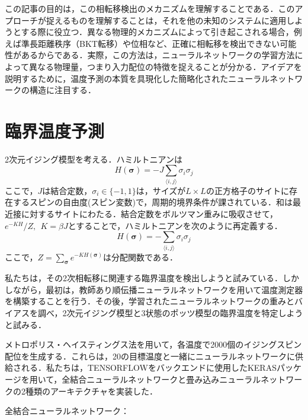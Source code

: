 \documentclass[a4paper,11pt]{jsarticle}
\begin{document}
この記事の目的は，この相転移検出のメカニズムを理解することである．このアプローチが捉えるものを理解することは，それを他の未知のシステムに適用しようとする際に役立つ．異なる物理的メカニズムによって引き起こされる場合，例えば準長距離秩序（BKT転移）や位相など、正確に相転移を検出できない可能性があるからである．実際，この方法は，ニューラルネットワークの学習方法によって異なる物理量，つまり入力配位の特徴を捉えることが分かる．アイデアを説明するために，温度予測の本質を具現化した簡略化されたニューラルネットワークの構造に注目する．

\section{臨界温度予測}
2次元イジング模型を考える．ハミルトニアンは
\begin{equation*}
  H(\bm{\sigma}) = - J \sum_{\langle i,j \rangle} \sigma_i \sigma_j
\end{equation*}
ここで，$J$は結合定数，$\sigma_i \in \{ -1, 1 \}$は，サイズが$L \times L$の正方格子のサイトに存在するスピンの自由度(スピン変数)で，周期的境界条件が課されている．和は最近接に対するサイトにわたる．結合定数をボルツマン重みに吸収させて，$e^{-KH}/Z, \ \ K = \beta J$とすることで，ハミルトニアンを次のように再定義する．
\begin{equation}
  H(\bm{\sigma}) = - \sum_{\langle i,j \rangle} \sigma_i \sigma_j
\end{equation}
ここで，$Z = \sum_{\bm{\sigma}}e^{-KH(\bm{\sigma})}$は分配関数である．\par
私たちは，その2次相転移に関連する臨界温度を検出しようと試みている．しかしながら，最初は，教師あり順伝播ニューラルネットワークを用いて温度測定器を構築することを行う．その後，学習されたニューラルネットワークの重みとバイアスを調べ，2次元イジング模型と3状態のポッツ模型の臨界温度を特定しようと試みる．\par
メトロポリス・ヘイスティングス法を用いて，各温度で2000個のイジングスピン配位を生成する．これらは，20の目標温度と一緒にニューラルネットワークに供給される．私たちは，TENSORFLOWをバックエンドに使用したKERASパッケージを用いて，全結合ニューラルネットワークと畳み込みニューラルネットワークの2種類のアーキテクチャを実装した．\par
全結合ニューラルネットワーク：
\end{document}
